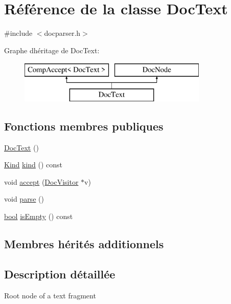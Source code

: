 \hypertarget{class_doc_text}{}\section{Référence de la classe Doc\+Text}
\label{class_doc_text}


{\ttfamily \#include $<$docparser.\+h$>$}

Graphe d\textquotesingle{}héritage de Doc\+Text\+:\begin{figure}[H]
\begin{center}
\leavevmode
\includegraphics[height=2.000000cm]{class_doc_text}
\end{center}
\end{figure}
\subsection*{Fonctions membres publiques}
\begin{DoxyCompactItemize}
\item 
\hyperlink{class_doc_text_a9a2fd222947c504077a4c3ee88d9c30a}{Doc\+Text} ()
\item 
\hyperlink{class_doc_node_aebd16e89ca590d84cbd40543ea5faadb}{Kind} \hyperlink{class_doc_text_aa559edcbf1308364e687fdf3974d697e}{kind} () const 
\item 
void \hyperlink{class_doc_text_ae54567e57c08f0be11156d2bab58872d}{accept} (\hyperlink{class_doc_visitor}{Doc\+Visitor} $\ast$v)
\item 
void \hyperlink{class_doc_text_aada5a740aa0832964895e683340b76a5}{parse} ()
\item 
\hyperlink{qglobal_8h_a1062901a7428fdd9c7f180f5e01ea056}{bool} \hyperlink{class_doc_text_a08ff04464ae9276580c56064fb992fea}{is\+Empty} () const 
\end{DoxyCompactItemize}
\subsection*{Membres hérités additionnels}


\subsection{Description détaillée}
Root node of a text fragment 


